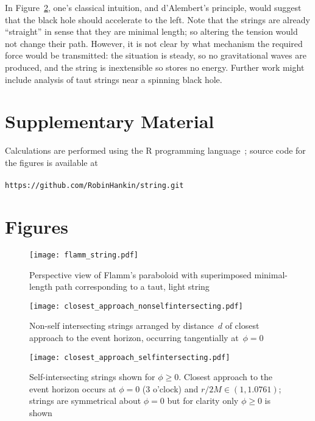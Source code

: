 \documentclass[review]{elsarticle}
\begin{document}
In Figure~\ref{closest_approach_non_self_intersecting}, one's
classical intuition, and d'Alembert's principle, would suggest that
the black hole should accelerate to the left.  Note that the strings
are already ``straight'' in sense that they are minimal length; so
altering the tension would not change their path.  However, it is not
clear by what mechanism the required force would be transmitted: the
situation is steady, so no gravitational waves are produced, and the
string is inextensible so stores no energy.  Further work might
include analysis of taut strings near a spinning black hole.


\section*{Supplementary Material}

Calculations are performed using the R programming language~\cite{rcore2018};
source code for the figures is available at
\\
\\
{\tt https://github.com/RobinHankin/string.git}


\section*{Figures}

\begin{figure}[h!] %
\centering
\texttt{[image: flamm\_string.pdf]}
\caption{Perspective view of Flamm's paraboloid with superimposed minimal-length
  path corresponding to a taut, light string}
\label{flamm}
\end{figure}

\begin{figure}[p] %
\centering
\texttt{[image: closest\_approach\_nonselfintersecting.pdf]}
\caption{Non-self intersecting strings arranged by distance~$d$ of
  closest approach to the event horizon, occurring tangentially
  at~$\phi=0$}
\label{closest_approach_non_self_intersecting}
\end{figure}

\begin{figure}[p] %
\centering
\texttt{[image: closest\_approach\_selfintersecting.pdf]}
\caption{Self-intersecting strings shown for $\phi\geqslant 0$.  Closest
  approach to the event horizon occurs at $\phi=0$ (3 o'clock) and
  $r/2M\in\left(1,1.0761\right)$; strings are symmetrical about $\phi=0$
  but for clarity only $\phi\geqslant 0$ is shown}
\label{closest_approach_self_intersecting}
\end{figure}
\end{document}

